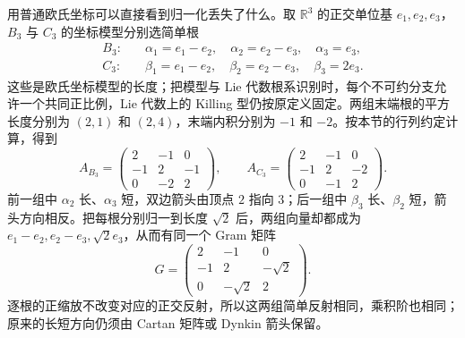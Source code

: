 \ProseParagraphBreak

用普通欧氏坐标可以直接看到归一化丢失了什么。取 \(\mathbb R^3\) 的正交单位基 \(e_1,e_2,e_3\)，\(B_3\) 与 \(C_3\) 的坐标模型分别选简单根
\[
	\begin{aligned}
		B_3:&\quad \alpha_1=e_1-e_2,\quad \alpha_2=e_2-e_3,\quad \alpha_3=e_3,\\
		C_3:&\quad \beta_1=e_1-e_2,\quad \beta_2=e_2-e_3,\quad \beta_3=2e_3.
	\end{aligned}
\]
这些是欧氏坐标模型的长度；把模型与 Lie 代数根系识别时，每个不可约分支允许一个共同正比例，Lie 代数上的 Killing 型仍按原定义固定。两组末端根的平方长度分别为 \((2,1)\) 和 \((2,4)\)，末端内积分别为 \(-1\) 和 \(-2\)。按本节的行列约定计算，得到
\[
	A_{B_3}=\begin{pmatrix}2&-1&0\\-1&2&-1\\0&-2&2\end{pmatrix},\qquad
	A_{C_3}=\begin{pmatrix}2&-1&0\\-1&2&-2\\0&-1&2\end{pmatrix}.
\]
前一组中 \(\alpha_2\) 长、\(\alpha_3\) 短，双边箭头由顶点 \(2\) 指向 \(3\)；后一组中 \(\beta_3\) 长、\(\beta_2\) 短，箭头方向相反。把每根分别归一到长度 \(\sqrt2\) 后，两组向量却都成为 \(e_1-e_2,e_2-e_3,\sqrt2e_3\)，从而有同一个 Gram 矩阵
\[
	G=\begin{pmatrix}
		2&-1&0\\
		-1&2&-\sqrt2\\
		0&-\sqrt2&2
	\end{pmatrix}.
\]
逐根的正缩放不改变对应的正交反射，所以这两组简单反射相同，乘积阶也相同；原来的长短方向仍须由 Cartan 矩阵或 Dynkin 箭头保留。
